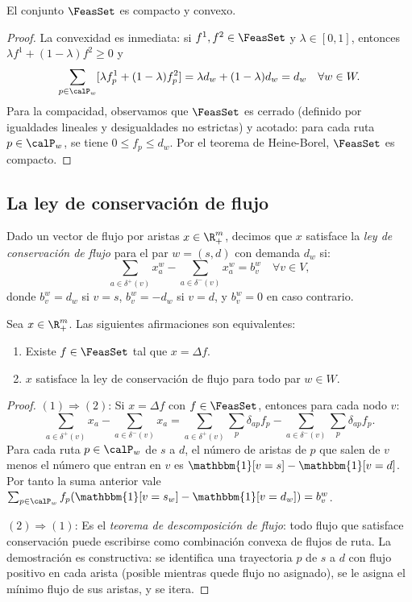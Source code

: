 \begin{proposition}\label{prop:omega_compact_convex}
El conjunto $\FeasSet$ es compacto y convexo.
\end{proposition}

\begin{proof}
La convexidad es inmediata: si $f^1, f^2 \in \FeasSet$ y $\lambda \in [0,1]$, entonces $\lambda f^1 + (1-\lambda)f^2 \geq 0$ y
\[
\sum_{p \in \calP_w} [\lambda f^1_p + (1-\lambda) f^2_p] = \lambda d_w + (1-\lambda) d_w = d_w \quad \forall w \in W.
\]
Para la compacidad, observamos que $\FeasSet$ es cerrado (definido por igualdades lineales y desigualdades no estrictas) y acotado: para cada ruta $p \in \calP_w$, se tiene $0 \leq f_p \leq d_w$. Por el teorema de Heine-Borel, $\FeasSet$ es compacto.
\end{proof}

\subsection{La ley de conservación de flujo}

\begin{definition}
Dado un vector de flujo por aristas $x \in \R^m_+$, decimos que $x$ satisface la \emph{ley de conservación de flujo} para el par $w = (s,d)$ con demanda $d_w$ si:
\[
\sum_{a \in \delta^+(v)} x_a^w - \sum_{a \in \delta^-(v)} x_a^w = b_v^w \quad \forall v \in V,
\]
donde $b_v^w = d_w$ si $v = s$, $b_v^w = -d_w$ si $v = d$, y $b_v^w = 0$ en caso contrario.
\end{definition}

\begin{theorem}\label{thm:equivalencia}
Sea $x \in \R^m_+$. Las siguientes afirmaciones son equivalentes:
\begin{enumerate}
    \item Existe $f \in \FeasSet$ tal que $x = \Delta f$.
    \item $x$ satisface la ley de conservación de flujo para todo par $w \in W$.
\end{enumerate}
\end{theorem}

\begin{proof}
$(1) \Rightarrow (2)$: Si $x = \Delta f$ con $f \in \FeasSet$, entonces para cada nodo $v$:
\[
\sum_{a \in \delta^+(v)} x_a - \sum_{a \in \delta^-(v)} x_a = \sum_{a \in \delta^+(v)} \sum_p \delta_{ap} f_p - \sum_{a \in \delta^-(v)} \sum_p \delta_{ap} f_p.
\]
Para cada ruta $p \in \calP_w$ de $s$ a $d$, el número de aristas de $p$ que salen de $v$ menos el número que entran en $v$ es $\mathbbm{1}[v=s] - \mathbbm{1}[v=d]$. Por tanto la suma anterior vale $\sum_{p \in \calP_w} f_p (\mathbbm{1}[v=s_w] - \mathbbm{1}[v=d_w]) = b_v^w$.

$(2) \Rightarrow (1)$: Es el \emph{teorema de descomposición de flujo}: todo flujo que satisface conservación puede escribirse como combinación convexa de flujos de ruta. La demostración es constructiva: se identifica una trayectoria $p$ de $s$ a $d$ con flujo positivo en cada arista (posible mientras quede flujo no asignado), se le asigna el mínimo flujo de sus aristas, y se itera.
\end{proof}

